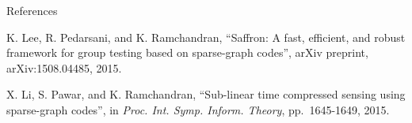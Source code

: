 \documentclass[final]{beamer}
\newlength{\threecolwid}
\begin{document}
\begin{frame}
\begin{columns}[t]
\begin{column}{\threecolwid}
\begin{block}{References}
\begin{thebibliography}{10}
K. Lee, R. Pedarsani, and K. Ramchandran, ``Saffron: A fast, efficient, and robust framework for group testing based on sparse-graph codes'', arXiv preprint, arXiv:1508.04485, 2015.

X. Li, S. Pawar, and K. Ramchandran, ``Sub-linear time compressed sensing using sparse-graph codes'', in \emph{Proc. Int. Symp. Inform. Theory},
  pp.~1645-1649, 2015.
 \end{thebibliography}
	  \end{block}

  \end{column}
  
\end{columns}
\end{frame}
\end{document}
